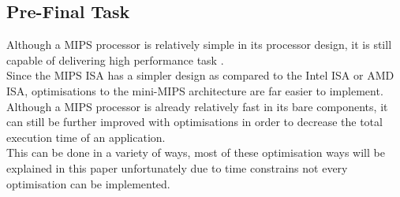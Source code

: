 \documentclass[10pt]{article}
\begin{document}
\subsection{Pre-Final Task}
Although a MIPS processor is relatively simple in its processor design, it is still capable of delivering high performance task .\\
Since the MIPS ISA has a simpler design as compared to the Intel ISA or AMD ISA, optimisations to the mini-MIPS architecture are far  easier to implement.\\
Although a MIPS processor is already relatively fast in its bare components, it can still be further improved with optimisations in order to decrease the total execution time of an application. \\
This can be done in a variety of ways, most of these optimisation ways will be explained in this paper unfortunately due to time constrains not every optimisation can be implemented. \\

\end{document}
